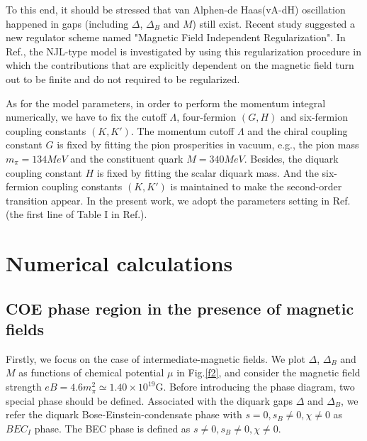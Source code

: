 \documentclass[prd, showpacs,nofootinbib,amsmath,amssymb,12pt]{revtex4}
\begin{document}
To this end, it should be stressed that van Alphen-de Haas(vA-dH) oscillation happened in gaps (including $\Delta$, $\Delta_B$ and $M$) still exist.
Recent study suggested a new regulator scheme named "Magnetic Field Independent Regularization"\cite{allen2015magnetized}.
In Ref.\cite{allen2015magnetized}, the NJL-type model is investigated by using this regularization procedure in which the contributions that are explicitly dependent on the magnetic field turn out to be finite and do not required to be regularized. 

As for the model parameters, in order to perform the momentum integral numerically, we have to fix the cutoff $\Lambda$, 
four-fermion $(G,H)$ and six-fermion coupling constants $(K, K')$.
The momentum cutoff $\Lambda$ and the chiral coupling constant $G$ is fixed by fitting the pion prosperities in vacuum, e.g.,
the pion mass $m_\pi = 134 MeV$ and the constituent quark $M = 340 MeV$.
Besides, the diquark coupling constant $H$ is fixed by fitting the scalar diquark mass.
And the six-fermion coupling constants $(K, K')$ is maintained to make the second-order transition appear.
In the present work, we adopt the parameters setting in Ref.\cite{abuki2010nambu} (the first line of Table I in Ref.\cite{abuki2010nambu}).

\section{Numerical calculations}
\subsection{COE phase region in the presence of magnetic fields}
\label{sec:3a}
Firstly, we focus on the case of intermediate-magnetic fields. 
We plot  $\Delta$, $\Delta_{B}$ and $M$ as functions of chemical potential $\mu$ in Fig.\ref{f2}, 
and consider the magnetic field strength $eB=4.6m^2_\pi \simeq 1.40\times10^{19}$G.
Before introducing the phase diagram, two special phase should be defined.
Associated with the diquark gaps $\Delta$ and $\Delta_B$, 
we refer the diquark Bose-Einstein-condensate phase with $s=0, s_B\neq 0, \chi \neq 0$ as $BEC_I$ phase.
The BEC phase is defined as $s \neq 0, s_B \neq 0, \chi \neq 0$.
\end{document}
